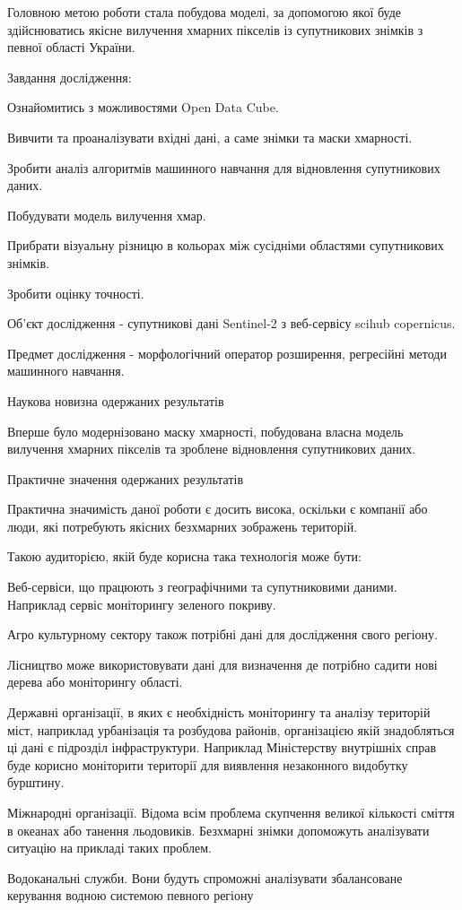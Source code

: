 Головною метою роботи стала побудова моделі, за допомогою якої буде здійснюватись якісне вилучення хмарних пікселів із супутникових знімків з певної області України.

Завдання дослідження:

Ознайомитись з можливостями Open Data Cube.

Вивчити та проаналізувати вхідні дані, а саме знімки та маски хмарності.

Зробити аналіз алгоритмів машинного навчання для відновлення супутникових даних.

Побудувати модель вилучення хмар.

Прибрати візуальну різницю в кольорах між сусідніми областями супутникових знімків.

Зробити оцінку точності.

Об’єкт дослідження - супутникові дані Sentinel-2 з веб-сервісу scihub copernicus.

Предмет дослідження - морфологічний оператор розширення, регресійні методи машинного навчання.

Наукова новизна одержаних результатів

Вперше було модернізовано маску хмарності, побудована власна модель вилучення хмарних пікселів та зроблене відновлення супутникових даних.

Практичне значення одержаних результатів

Практична значимість даної роботи є досить висока, оскільки є компанії або люди, які потребують якісних безхмарних зображень територій.

Такою аудиторією, якій буде корисна така технологія може бути:

Веб-сервіси, що працюють з географічними та супутниковими даними. Наприклад сервіс моніторингу зеленого покриву.

Агро культурному сектору також потрібні дані для дослідження свого регіону.

Лісництво може використовувати дані для визначення де потрібно садити нові дерева або моніторингу області.

Державні організації, в яких є необхідність моніторингу та аналізу територій міст, наприклад урбанізація та розбудова районів, організацією якій знадобляться ці дані є підрозділ інфраструктури. Наприклад Міністерству внутрішніх справ буде корисно моніторити території для виявлення незаконного видобутку бурштину.

Міжнародні організації. Відома всім проблема скупчення великої кількості сміття в океанах або танення льодовиків. Безхмарні знімки допоможуть аналізувати ситуацію на прикладі таких проблем.

Водоканальні служби. Вони будуть спроможні аналізувати збалансоване керування водною системою певного регіону

